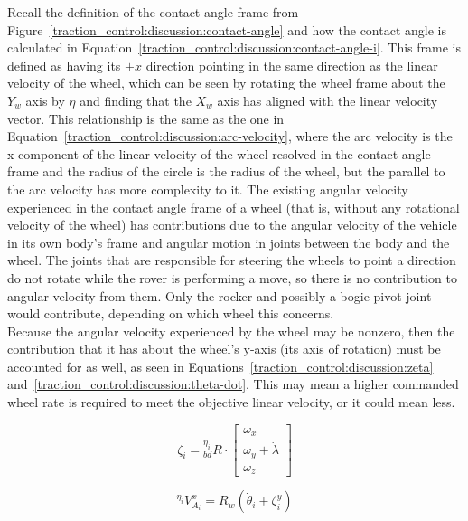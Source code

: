 Recall the definition of the contact angle frame from Figure~\ref{traction_control:discussion:contact-angle} and how the contact angle is calculated in Equation~\ref{traction_control:discussion:contact-angle-i}. This frame is defined as having its $+x$ direction pointing in the same direction as the linear velocity of the wheel, which can be seen by rotating the wheel frame about the $Y_{w}$ axis by $\eta$ and finding that the $X_{w}$ axis has aligned with the linear velocity vector. This relationship is the same as the one in Equation~\ref{traction_control:discussion:arc-velocity}, where the arc velocity is the x component of the linear velocity of the wheel resolved in the contact angle frame and the radius of the circle is the radius of the wheel, but the parallel to the arc velocity has more complexity to it. The existing angular velocity experienced in the contact angle frame of a wheel (that is, without any rotational velocity of the wheel) has contributions due to the angular velocity of the vehicle in its own body's frame and angular motion in joints between the body and the wheel. The joints that are responsible for steering the wheels to point a direction do not rotate while the rover is performing a move, so there is no contribution to angular velocity from them. Only the rocker and possibly a bogie pivot joint would contribute, depending on which wheel this concerns. \\

Because the angular velocity experienced by the wheel may be nonzero, then the contribution that it has about the wheel's y-axis (its axis of rotation) must be accounted for as well, as seen in Equations~\ref{traction_control:discussion:zeta} and~\ref{traction_control:discussion:theta-dot}. This may mean a higher commanded wheel rate is required to meet the objective linear velocity, or it could mean less.

\begin{equation}\label{traction_control:discussion:zeta}
	\zeta_{i} = {}^{\eta_{i}}_{bd}R \cdot \left[\begin{array}{c}
		\omega_{x} \\
		\omega_{y} + \dot{\lambda} \\
		\omega_{z}
	\end{array}\right]
\end{equation}

\begin{equation}\label{traction_control:discussion:theta-dot}
	{}^{\eta_{i}}V^{x}_{A_{i}} = R_{w}\left(\dot{\theta}_{i} + \zeta^{y}_{i}\right)
\end{equation}

